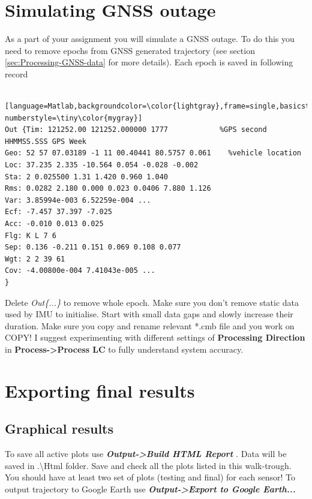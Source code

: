 \documentclass[british,DIV=calc, paper=a4, fontsize=12pt, onecolumn]{scrartcl}
\begin{document}
\section{Simulating GNSS outage\label{sec:Simulating-GNSS-outage}}

As a part of your assignment you will simulate a GNSS outage. To do this you need to remove epochs from GNSS generated trajectory (see section \ref{sec:Processing-GNSS-data} for more details). Each epoch is saved in following record

\begin{lstlisting} [language=Matlab,backgroundcolor=\color{lightgray},frame=single,basicstyle=\footnotesize,numbers=left,numbersep=5pt, numberstyle=\tiny\color{mygray}]
Out {Tim: 121252.00 121252.000000 1777 			  %GPS second HHMMSS.SSS GPS Week
Geo: 52 57 07.03189 -1 11 00.40441 80.5757 0.061 	%vehicle location
Loc: 37.235 2.335 -10.564 0.054 -0.028 -0.002 	
Sta: 2 0.025500 1.31 1.420 0.960 1.040 	
Rms: 0.0282 2.180 0.000 0.023 0.0406 7.880 1.126 	
Var: 3.85994e-003 6.52259e-004 ...	
Ecf: -7.457 37.397 -7.025 	
Acc: -0.010 0.013 0.025 	
Flg: K L 7 6 	
Sep: 0.136 -0.211 0.151 0.069 0.108 0.077 	
Wgt: 2 2 39 61 	
Cov: -4.00800e-004 7.41043e-005 ...
}
\end{lstlisting}

Delete \emph{Out\{...\}} to remove whole epoch. Make sure you don't remove static data used by IMU to initialise. Start with small data gaps and slowly increase their duration. Make sure you copy and rename relevant {*}.cmb file and you work on COPY! I suggest experimenting with different settings of \textbf{Processing Direction} in \textbf{Process->Process LC} to fully understand system accuracy.



\section{Exporting final results\label{sec:Exporting-final-results}}

\subsection{Graphical results}

To save all active plots use\textbf{\emph{ Output->Build HTML Report }}\emph{. }Data will be saved in .\textbackslash{}Html folder. Save and check all the plots listed in this walk-trough. You should have at least two set of plots (testing and final) for each sensor!  To output trajectory to Google Earth use\textbf{\emph{ Output->Export to Google Earth...}}
\end{document}

